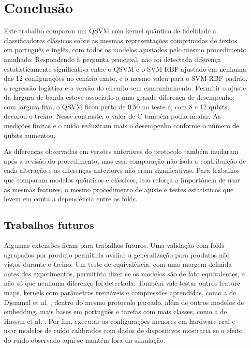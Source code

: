 \documentclass[conference]{IEEEtran}
\newcommand{\svm}{\mbox{SVM-RBF}}
\begin{document}
\section{Conclusão}
\label{sec:conclusao}

Este trabalho comparou um QSVM com kernel quântico de fidelidade a classificadores clássicos sobre as mesmas representações comprimidas de textos em português e inglês, com todos os modelos ajustados pelo mesmo procedimento aninhado. Respondendo à pergunta principal, não foi detectada diferença estatisticamente significativa entre o QSVM e o \svm{} ajustado em nenhuma das 12 configurações no cenário exato, e o mesmo valeu para o \svm{} padrão, a regressão logística e a versão do circuito sem emaranhamento. Permitir o ajuste da largura de banda esteve associado a uma grande diferença de desempenho: com largura fixa, o QSVM ficou perto de 0,50 no teste e, com 8 e 12 qubits, decorou o treino. Nesse contraste, o valor de C também podia mudar. As medições finitas e o ruído reduziram mais o desempenho conforme o número de qubits aumentou.

As diferenças observadas em versões anteriores do protocolo também mudaram após a revisão do procedimento, mas essa comparação não isola a contribuição de cada alteração e as diferenças anteriores não eram significativas. Para trabalhos que comparam modelos quânticos e clássicos, isso reforça a importância de usar as mesmas features, o mesmo procedimento de ajuste e testes estatísticos que levem em conta a dependência entre os folds.

\subsection{Trabalhos futuros}
Algumas extensões ficam para trabalhos futuros. Uma validação com folds agrupados por produto permitiria avaliar a generalização para produtos não vistos durante o treino. Um teste de equivalência, com uma margem definida antes dos experimentos, permitiria dizer se os modelos são de fato equivalentes, e não só que nenhuma diferença foi detectada. Também vale testar outros feature maps, kernels com parâmetros treináveis e compressões aprendidas, como a de Djemmal et al. \cite{djemmal2025}, dentro do mesmo protocolo pareado, além de outros modelos de embedding, mais bases em português e tarefas com mais classes, como a de Hassan et al. \cite{hassan2026}. Por fim, executar as configurações menores em hardware real e usar modelos de ruído calibrados com dados de dispositivos mostraria se o efeito do ruído observado aqui se mantém fora da simulação.
\end{document}
